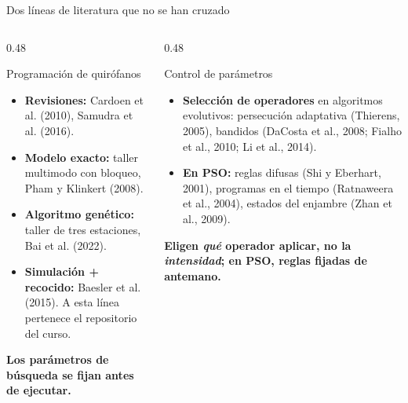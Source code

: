 \documentclass[aspectratio=169,11pt]{beamer}
\newcommand{\risk}[1]{\textcolor{warn}{\textbf{#1}}}
\begin{document}
\begin{frame}{Dos líneas de literatura que no se han cruzado}
  \begin{columns}[t]
    \begin{column}{0.48\textwidth}
      \begin{block}{Programación de quirófanos}
        \footnotesize
        \begin{itemize}
          \item \textbf{Revisiones:} Cardoen et al. (2010), Samudra et al. (2016).
          \item \textbf{Modelo exacto:} taller multimodo con bloqueo, Pham y Klinkert (2008).
          \item \textbf{Algoritmo genético:} taller de tres estaciones, Bai et al. (2022).
          \item \textbf{Simulación + recocido:} Baesler et al. (2015). A esta línea pertenece el repositorio del curso.
        \end{itemize}
        \vspace{0.1cm}
        \risk{Los parámetros de búsqueda se fijan antes de ejecutar.}
      \end{block}
    \end{column}

    \begin{column}{0.48\textwidth}
      \begin{block}{Control de parámetros}
        \footnotesize
        \begin{itemize}
          \item \textbf{Selección de operadores} en algoritmos evolutivos: persecución adaptativa (Thierens, 2005), bandidos (DaCosta et al., 2008; Fialho et al., 2010; Li et al., 2014).
          \item \textbf{En PSO:} reglas difusas (Shi y Eberhart, 2001), programas en el tiempo (Ratnaweera et al., 2004), estados del enjambre (Zhan et al., 2009).
        \end{itemize}
        \vspace{0.1cm}
        \risk{Eligen \emph{qué} operador aplicar, no la \emph{intensidad}; en PSO, reglas fijadas de antemano.}
      \end{block}
    \end{column}
  \end{columns}
\end{frame}
\end{document}

